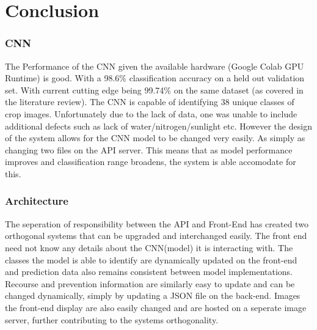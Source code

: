 \chapter{Conclusion}
\label{conclusion}
  \subsection{CNN}
    The Performance of the CNN given the available hardware (Google Colab GPU Runtime) is good. With a 98.6\% classification accuracy on a held out validation set. With current cutting edge being 99.74\% on the same dataset (as covered in the literature review). The CNN is capable of identifying 38 unique classes of crop images. Unfortunately due to the lack of data, one was unable to include additional defects such as lack of water/nitrogen/sunlight etc. However the design of the system allows for the CNN model to be changed very easily. As simply as changing two files on the API server. This means that as model performance improves and classification range broadens, the system is able accomodate for this.

  \subsection{Architecture}
    The seperation of responsibility between the API and Front-End has created two orthogonal systems that can be upgraded and interchanged easily. The front end need not know any details about the CNN(model) it is interacting with. The classes the model is able to identify are dynamically updated on the front-end and prediction data also remains consistent between model implementations. Recourse and prevention information are similarly easy to update and can be changed dynamically, simply by updating a JSON file on the back-end. Images the front-end display are also easily changed and are hosted on a seperate image server, further contributing to the systems orthogonality.

